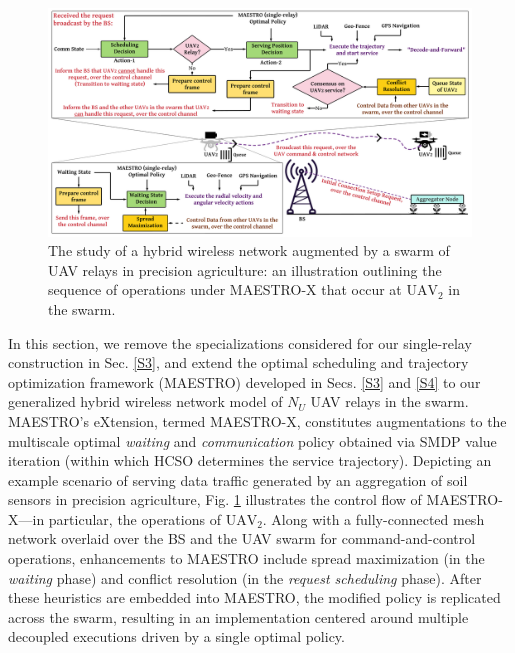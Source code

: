 \documentclass[12pt, draftcls, onecolumn]{IEEEtran}
\theoremstyle{plain}
\theoremstyle{definition}
\theoremstyle{remark}
\begin{document}
\begin{figure} [t]
    \centering
    \includegraphics[width=0.9\linewidth]{figs/Sequence_of_Operations.png}
    \caption{The study of a hybrid wireless network augmented by a swarm of UAV relays in precision agriculture: an illustration outlining the sequence of operations under MAESTRO-X that occur at $\text{UAV}_{2}$ in the swarm.}
    \vspace{-10mm}
    \label{F5}
\end{figure}

In this section, we remove the specializations considered for our single-relay construction in Sec. \ref{S3}, and extend the optimal scheduling and trajectory optimization framework (MAESTRO) developed in Secs. \ref{S3} and \ref{S4} to our generalized hybrid wireless network model of $N_{U}$ UAV relays in the swarm. MAESTRO's eXtension, termed MAESTRO-X, constitutes augmentations to the multiscale optimal \emph{waiting} and \emph{communication} policy obtained via SMDP value iteration (within which HCSO determines the service trajectory). Depicting an example scenario of serving data traffic generated by an aggregation of soil sensors in precision agriculture, Fig. \ref{F5} illustrates the control flow of MAESTRO-X---in particular, the operations of $\mathrm{UAV}_{2}$. Along with a fully-connected mesh network overlaid over the BS and the UAV swarm for command-and-control operations, enhancements to MAESTRO include spread maximization (in the \emph{waiting} phase) and conflict resolution (in the \emph{request scheduling} phase). After these heuristics are embedded into MAESTRO, the modified policy is replicated across the swarm, resulting in an implementation centered around multiple decoupled executions driven by a single optimal policy.
\end{document}
